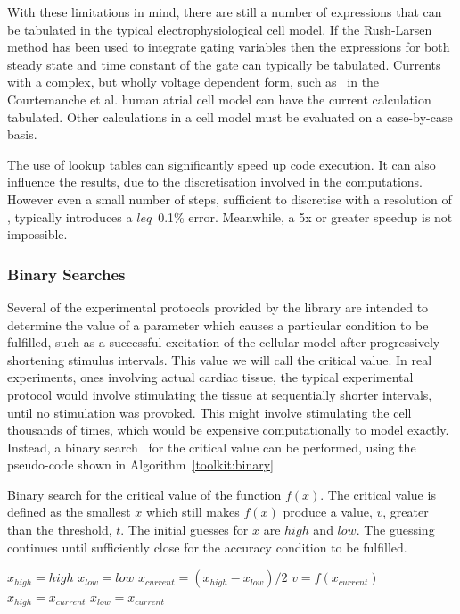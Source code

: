 With these limitations in mind, there are still a number of expressions that can
be tabulated in the typical electrophysiological cell model.
If the Rush-Larsen method has been used to integrate gating variables then the
expressions for both steady state and time constant of the gate can typically be
tabulated.
Currents with a complex, but wholly voltage dependent form, such as \ in
the Courtemanche et al. human atrial cell model can have the current calculation
tabulated.
Other calculations in a cell model must be evaluated on a case-by-case basis.

The use of lookup tables can significantly speed up code execution.
It can also influence the results, due to the discretisation involved in the
computations.
However even a small number of steps, sufficient to discretise with a
resolution of , typically introduces a $leq$~0.1\% error.
Meanwhile, a 5x or greater speedup is not impossible.

\subsubsection{Binary Searches}

Several of the experimental protocols provided by the library are intended to
determine the value of a parameter which causes a particular condition to be
fulfilled, such as a successful excitation of the cellular model after
progressively shortening stimulus intervals.  This value we will call the
critical value. In real experiments, ones involving actual cardiac tissue, the
typical experimental protocol would involve stimulating the tissue at
sequentially shorter intervals, until no stimulation was provoked.  This might
involve stimulating the cell thousands of times, which would be expensive
computationally to model exactly.  Instead, a binary search~\cite{IntroAlgo} for the critical
value can be performed, using the pseudo-code shown in Algorithm~\ref{toolkit:binary}

\begin{algorithm}
\caption{
Binary search for the critical value of the function $f(x)$.
The critical value is defined as the smallest $x$ which still makes $f(x)$
produce a value, $v$, greater than the threshold, $t$.
The initial guesses for $x$ are $high$ and $low$.
The guessing continues until sufficiently close for the accuracy condition to be
fulfilled.
}
\label{toolkit:binary}
\begin{algorithmic}
\STATE $x_{high} = high$
\STATE $x_{low} = low$
\REPEAT
\STATE $x_{current} = \left(x_{high} - x_{low}\right) / 2$
\STATE $v = f\!\left(x_{current}\right)$
\STATE $x_{high} = x_{current}$
\ELSE
\STATE $x_{low} = x_{current}$
\ENDIF
{}
\end{algorithmic}
\end{algorithm}

